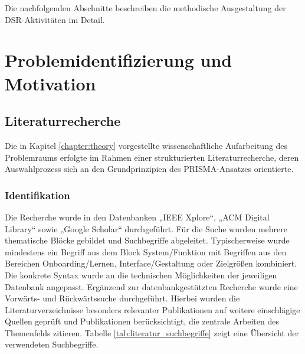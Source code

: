 Die nachfolgenden Abschnitte beschreiben die methodische Ausgestaltung der DSR-Aktivitäten im Detail.

\section{Problemidentifizierung und Motivation}
\label{sec:Methodik_Phase_eins}

\subsection{Literaturrecherche}
\label{subsec:Literaturrecherche}

Die in Kapitel \ref{chapter:theory} vorgestellte wissenschaftliche Aufarbeitung des Problemraums erfolgte im Rahmen einer strukturierten Literaturrecherche, deren Auswahlprozess sich an den Grundprinzipien des PRISMA-Ansatzes \cite{page2021prisma} orientierte. 

\subsubsection{Identifikation}
\label{subsubsec:Identifikation}

Die Recherche wurde in den Datenbanken „IEEE Xplore“, „ACM Digital Library“ sowie „Google Scholar“ durchgeführt. Für die Suche wurden mehrere thematische Blöcke gebildet und Suchbegriffe abgeleitet. Typischerweise wurde mindestens ein Begriff aus dem Block System/Funktion mit Begriffen aus den Bereichen Onboarding/Lernen, Interface/Gestaltung oder Zielgrößen kombiniert. Die konkrete Syntax wurde an die technischen Möglichkeiten der jeweiligen Datenbank angepasst. Ergänzend zur datenbankgestützten Recherche wurde eine Vorwärts- und Rückwärtssuche durchgeführt. Hierbei wurden die Literaturverzeichnisse besonders relevanter Publikationen auf weitere einschlägige Quellen geprüft und Publikationen berücksichtigt, die zentrale Arbeiten des Themenfelds zitieren. Tabelle \ref{tab:literatur_suchbegriffe} zeigt eine Übersicht der verwendeten Suchbegriffe.

